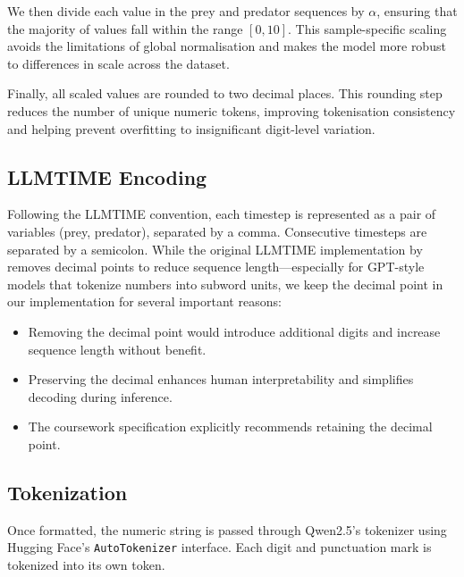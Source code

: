 \documentclass[a4paper,12pt]{article}
\begin{document}
We then divide each value in the prey and predator sequences by $\alpha$, ensuring that the majority of values fall within the range $[0, 10]$. This sample-specific scaling avoids the limitations of global normalisation and makes the model more robust to differences in scale across the dataset.

Finally, all scaled values are rounded to two decimal places. This rounding step reduces the number of unique numeric tokens, improving tokenisation consistency and helping prevent overfitting to insignificant digit-level variation.


\subsection*{LLMTIME Encoding}

Following the LLMTIME convention, each timestep is represented as a pair of variables (prey, predator), separated by a comma. Consecutive timesteps are separated by a semicolon. While the original LLMTIME implementation by \citet{gruver2023language} removes decimal points to reduce sequence length—especially for GPT-style models that tokenize numbers into subword units, we keep the decimal point in our implementation for several important reasons:

\begin{itemize}
  \item Removing the decimal point would introduce additional digits and increase sequence length without benefit.
  \item Preserving the decimal enhances human interpretability and simplifies decoding during inference.
  \item The coursework specification explicitly recommends retaining the decimal point.
\end{itemize}

\subsection*{Tokenization}

Once formatted, the numeric string is passed through Qwen2.5’s tokenizer using Hugging Face’s \texttt{AutoTokenizer} interface. Each digit and punctuation mark is tokenized into its own token.
\end{document}
